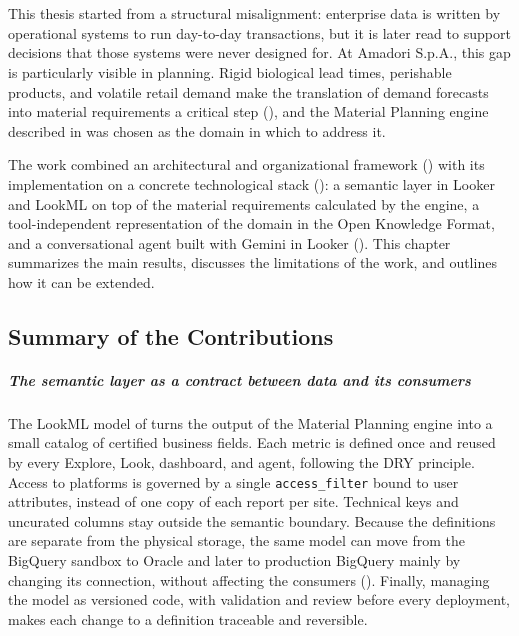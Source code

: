 
\chapter{\conclusionsname}
\label{chap:conclusions}

This thesis started from a structural misalignment: enterprise data is written by operational systems to run day-to-day transactions, but it is later read to support decisions that those systems were never designed for. At Amadori S.p.A., this gap is particularly visible in planning. Rigid biological lead times, perishable products, and volatile retail demand make the translation of demand forecasts into material requirements a critical step (), and the Material Planning engine described in  was chosen as the domain in which to address it.

The work combined an architectural and organizational framework () with its implementation on a concrete technological stack (): a semantic layer in Looker and LookML on top of the material requirements calculated by the engine, a tool-independent representation of the domain in the Open Knowledge Format, and a conversational agent built with Gemini in Looker (). This chapter summarizes the main results, discusses the limitations of the work, and outlines how it can be extended.

\section{Summary of the Contributions}
\label{sec:conclusions_contributions}

\paragraph{The semantic layer as a contract between data and its consumers}
The LookML model of  turns the output of the Material Planning engine into a small catalog of certified business fields. Each metric is defined once and reused by every Explore, Look, dashboard, and agent, following the DRY principle. Access to platforms is governed by a single \texttt{access\_filter} bound to user attributes, instead of one copy of each report per site. Technical keys and uncurated columns stay outside the semantic boundary. Because the definitions are separate from the physical storage, the same model can move from the BigQuery sandbox to Oracle and later to production BigQuery mainly by changing its connection, without affecting the consumers (). Finally, managing the model as versioned code, with validation and review before every deployment, makes each change to a definition traceable and reversible.

